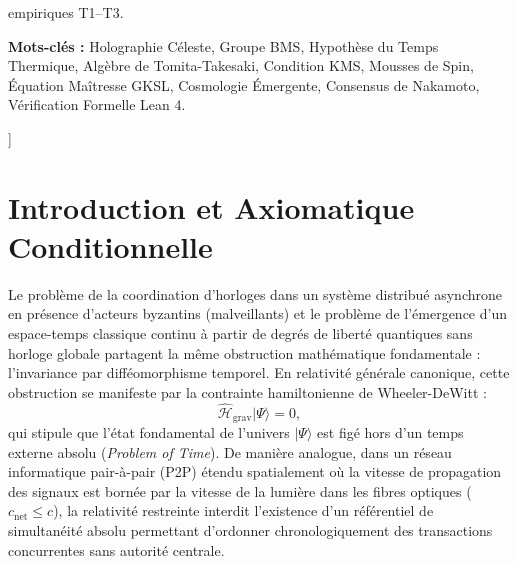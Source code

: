 \documentclass[10pt,twocolumn,a4paper]{article}
\theoremstyle{plain}
\theoremstyle{definition}
\theoremstyle{remark}
\begin{document}
\begin{minipage}{\textwidth}
\begin{minipage}{0.92\textwidth}
empiriques T1--T3.\par
        \vspace{0.2cm}
        \noindent \textbf{Mots-clés :} Holographie Céleste, Groupe BMS, Hypothèse du Temps Thermique, Algèbre de Tomita-Takesaki, Condition KMS, Mousses de Spin, Équation Maîtresse GKSL, Cosmologie Émergente, Consensus de Nakamoto, Vérification Formelle Lean 4.
    \end{minipage}
    \vspace{0.6cm}
\end{minipage}%
]

\section{Introduction et Axiomatique Conditionnelle}

Le problème de la coordination d'horloges dans un système distribué asynchrone en présence d'acteurs byzantins (malveillants) et le problème de l'émergence d'un espace-temps classique continu à partir de degrés de liberté quantiques sans horloge globale partagent la même obstruction mathématique fondamentale : l'invariance par difféomorphisme temporel. En relativité générale canonique, cette obstruction se manifeste par la contrainte hamiltonienne de Wheeler-DeWitt :
\begin{equation}
    \hat{\mathcal{H}}_{\text{grav}} |\Psi\rangle = 0,
    \label{eq:WDW}
\end{equation}
qui stipule que l'état fondamental de l'univers $|\Psi\rangle$ est figé hors d'un temps externe absolu (\textit{Problem of Time}). De manière analogue, dans un réseau informatique pair-à-pair (P2P) étendu spatialement où la vitesse de propagation des signaux est bornée par la vitesse de la lumière dans les fibres optiques ($c_{\text{net}} \le c$), la relativité restreinte interdit l'existence d'un référentiel de simultanéité absolu permettant d'ordonner chronologiquement des transactions concurrentes sans autorité centrale.
\end{document}
